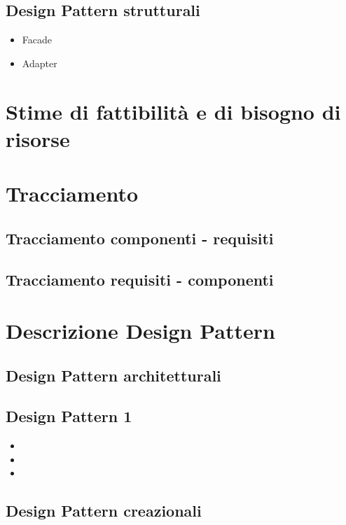 \subsection{Design Pattern strutturali} %
\begin{itemize}
\item Facade
\item Adapter
\end{itemize}

\newpage
\section{Stime di fattibilità e di bisogno di risorse}%

\newpage
\section{Tracciamento} %
\subsection{Tracciamento componenti - requisiti} %
\subsection{Tracciamento requisiti - componenti} %

\newpage
\appendix
\section{Descrizione Design Pattern} %

\subsection{Design Pattern architetturali} %
\subsection{Design Pattern 1} %
\begin{itemize}
\item {} 
\item {} 
\item {}
\end{itemize}

\subsection{Design Pattern creazionali} %
